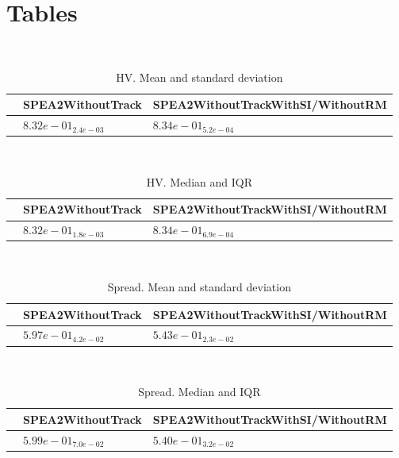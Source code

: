 \documentclass{article}
\title{}
\author{}
\begin{document}
\maketitle
\section{Tables}
\
\begin{table}
\caption{HV. Mean and standard deviation}
\label{table:mean.HV}
\centering
\begin{scriptsize}
\begin{tabular}{lll}
\hline & SPEA2WithoutTrack &  SPEA2WithoutTrackWithSI/WithoutRM\\
\hline
 & \cellcolor{gray25}$  8.32e-01_{ 2.4e-03}$ & \cellcolor{gray95}$  8.34e-01_{ 5.2e-04}$ \\
\hline
\end{tabular}
\end{scriptsize}
\end{table}
\
\begin{table}
\caption{HV. Median and IQR}
\label{table:median.HV}
\begin{scriptsize}
\centering
\begin{tabular}{lll}
\hline & SPEA2WithoutTrack &  SPEA2WithoutTrackWithSI/WithoutRM\\
\hline
 & \cellcolor{gray25}$  8.32e-01_{ 1.8e-03}$ & \cellcolor{gray95}$  8.34e-01_{ 6.9e-04}$ \\
\hline
\end{tabular}
\end{scriptsize}
\end{table}
\
\begin{table}
\caption{Spread. Mean and standard deviation}
\label{table:mean.Spread}
\centering
\begin{scriptsize}
\begin{tabular}{lll}
\hline & SPEA2WithoutTrack &  SPEA2WithoutTrackWithSI/WithoutRM\\
\hline
 & \cellcolor{gray25}$  5.97e-01_{ 4.2e-02}$ & \cellcolor{gray95}$  5.43e-01_{ 2.3e-02}$ \\
\hline
\end{tabular}
\end{scriptsize}
\end{table}
\
\begin{table}
\caption{Spread. Median and IQR}
\label{table:median.Spread}
\begin{scriptsize}
\centering
\begin{tabular}{lll}
\hline & SPEA2WithoutTrack &  SPEA2WithoutTrackWithSI/WithoutRM\\
\hline
 & \cellcolor{gray25}$  5.99e-01_{ 7.0e-02}$ & \cellcolor{gray95}$  5.40e-01_{ 3.2e-02}$ \\
\hline
\end{tabular}
\end{scriptsize}
\end{table}
\end{document}
